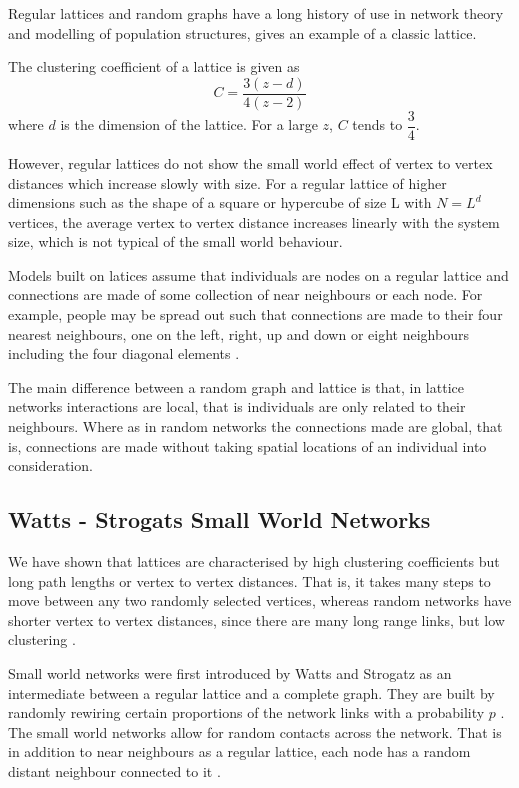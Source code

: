 Regular lattices and random graphs have a long history of use in network theory and modelling of population structures, \cite{harris1974contact} gives an example of a classic lattice.

The clustering coefficient of a lattice is given as  
\begin{equation}
C = \frac{3(z - d)}{4(z -2)}
\end{equation}
where $d$ is the dimension of the lattice. For a large $z$, $C$ tends to $\dfrac{3}{4}$.

However, regular lattices do not show the small world effect of vertex to vertex distances which increase slowly with size. For a regular lattice of higher dimensions such as the shape of a square or hypercube of size L with $N = L^d$ vertices, the average vertex to vertex distance increases linearly with the system size, which is not typical of the small world behaviour.  


Models built on latices assume that individuals are  nodes on a regular lattice and connections are made of some collection of near neighbours or each node. For example, people may be spread out such that connections are made to their four nearest neighbours, one on the left, right, up and down or  eight neighbours including the four diagonal elements  \citep{lloyd2006infection}.

The main difference between a random graph and lattice is that, in lattice networks interactions are local, that is individuals are only related to their neighbours. Where as in random networks the connections  made are global, that is, connections are made without taking spatial locations of an individual into consideration. 

\subsection{Watts - Strogats Small World Networks}
We have shown that lattices are characterised by high clustering coefficients but long path lengths or vertex to vertex distances. That is, it takes many steps to move between any two randomly selected vertices, whereas random networks have shorter vertex to vertex distances, since there are many long range links, but low clustering \citep{keeling2005networks}.


Small world networks were first introduced by Watts and Strogatz as an intermediate between a regular lattice and a complete graph. They are built by randomly rewiring certain proportions of the network links with a probability $p$ \citep{watts1998collective}. The small world networks allow for random contacts across the network. That is in addition to near neighbours as a regular lattice, each node has a random distant neighbour connected to it \citep{watts1998collective}.


